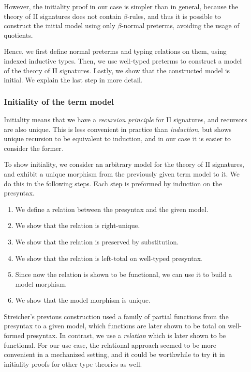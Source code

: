However, the initiality proof in our case is simpler than in general, because
the theory of II signatures does not contain $\beta$-rules, and thus it is
possible to construct the initial model using only $\beta$-normal preterms,
avoiding the usage of quotients.

Hence, we first define normal preterms and typing relations on them, using indexed
inductive types. Then, we use well-typed preterms to construct a model of the theory
of II signatures. Lastly, we show that the constructed model is initial. We explain
the last step in more detail.

\subsubsection*{Initiality of the term model}

Initiality means that we have a \emph{recursion principle} for II signatures,
and recursors are also unique. This is less convenient in practice than
\emph{induction}, but \cite{qiit} shows unique recursion to be equivalent to
induction, and in our case it is easier to consider the former.

To show initiality, we consider an arbitrary model for the theory of II
signatures, and exhibit a unique morphism from the previously given term model
to it. We do this in the following steps. Each step is preformed by induction on
the presyntax.

\begin{enumerate}
  \item We define a relation between the presyntax and the given model.
  \item We show that the relation is right-unique.
  \item We show that the relation is preserved by substitution.
  \item We show that the relation is left-total on well-typed presyntax.
  \item Since now the relation is shown to be functional, we can use it to
        build a model morphism.
  \item We show that the model morphism is unique.
\end{enumerate}

Streicher's previous construction \cite{streicher2012semantics} used a family of
partial functions from the presyntax to a given model, which functions are later
shown to be total on well-formed presyntax. In contrast, we use a
\emph{relation} which is later shown to be functional. For our use case, the
relational approach seemed to be more convenient in a mechanized setting, and it
could be worthwhile to try it in initiality proofs for other type theories as
well.

